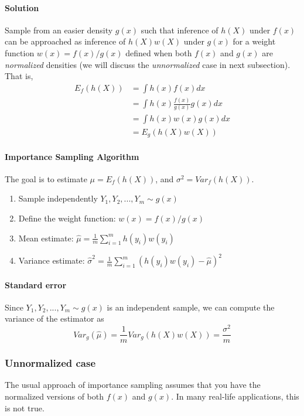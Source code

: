 \documentclass[useAMS,usenatbib]{biom}
\begin{document}
\paragraph{Solution} Sample from an easier density $g(x)$ such that inference of $h(X)$ under $f(x)$ can be approached as
inference of $h(X)w(X)$ under $g(x)$ for a weight function
$w(x)=f(x)/g(x)$ defined when both $f(x)$ and $g(x)$ are \textit{normalized} densities (we will discuss the
    \textit{unnormalized} case in next subsection). That is,
\begin{eqnarray*}
E_f(h(X)) &= \int h(x) f(x) dx \\ 
&= \int h(x) \frac{f(x)}{g(x)} g(x) dx \\
&= \int h(x) w(x) g(x) dx \\
&= E_g(h(X)w(X))
\end{eqnarray*}

\paragraph{Importance Sampling Algorithm} The goal is to estimate
$\mu = E_f(h(X))$, and $\sigma^2 = Var_f(h(X))$.
\begin{enumerate}
\item{Sample independently $Y_1,Y_2,...,Y_m \sim g(x)$}
\item{Define the weight function: $w(x) = f(x)/g(x)$}
\item{Mean estimate: $\hat{\mu} = \frac{1}{m} \sum_{i=1}^m
    h(y_i)w(y_i)$}
\item{Variance estimate: $\hat{\sigma}^2 = \frac{1}{m} \sum_{i=1}^m
    (h(y_i)w(y_i) - \hat{\mu})^2$}
\end{enumerate}


\paragraph{Standard error}
Since $Y_1,Y_2,...,Y_m \sim g(x)$ is an independent sample, we can
compute the variance of the estimator as
\begin{equation}
Var_g(\hat{\mu}) = \frac{1}{m} Var_g(h(X)w(X)) = \frac{\sigma^2}{m}
\end{equation}

\subsubsection{Unnormalized case}
The usual approach of importance sampling assumes that you have the
normalized versions of both $f(x)$ and $g(x)$. In many real-life
applications, this is not true.
\end{document}
